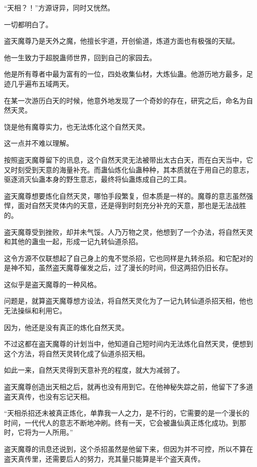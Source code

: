 
\begin{this_body}

“天相？！”方源讶异，同时又恍然。

一切都明白了。

盗天魔尊乃是天外之魔，他擅长宇道，开创偷道，炼道方面也有极强的天赋。

他一生致力于超脱蛊师世界，回到自己的家园去。

他是所有尊者中最为富有的一位，四处收集仙材，大炼仙蛊。他游历地方最多，足迹几乎遍布五域两天。

在某一次游历白天的时候，他意外地发现了一个奇妙的存在，研究之后，命名为自然天灵。

饶是他有魔尊实力，也无法炼化这个自然天灵。

这一点并不难以理解。

按照盗天魔尊留下的讯息，这个自然天灵无法被带出太古白天，而在白天当中，它又时刻受到天意的海量补充。而蛊仙炼化仙蛊种种，其本质就在于用自己的意志，驱逐消灭仙蛊本身的野生意志，最终将仙蛊炼成自己的工具。

盗天魔尊想要炼化自然天灵，哪怕手段繁复，但本质是一样的。魔尊的意志虽然强悍，面对自然天灵体内的天意，还是得到时刻充分补充的天意，那也是无法战胜的。

盗天魔尊受到挫败，却并未气馁。人乃万物之灵，他想到了一个办法，将自然天灵和其他的蛊虫一起，形成一记九转仙道杀招。

这令方源不仅联想起了自己身上的鬼不觉杀招，它也同样是九转杀招。和它配对的是神不知，虽然盗天魔尊催发之后，过了漫长的时间，但这两招仍旧长存。

这似乎是盗天魔尊的一种风格。

问题是，就算盗天魔尊想方设法，将自然天灵化为了一记九转仙道杀招天相，他也无法操纵和利用它。

因为，他还是没有真正的炼化自然天灵。

不过这都在盗天魔尊的计划当中，他知道自己短时间内无法炼化自然天灵，便想到这个方法，将自然天灵转化成了仙道杀招天相。

如此一来，自然天灵得到天意补充的程度，就大为减弱了。

盗天魔尊创造出天相之后，就再也没有用到它。在他神秘失踪之前，他留下了多道盗天真传，也没有忘记天相。

“天相杀招还未被真正炼化，单靠我一人之力，是不行的，它需要的是一个漫长的时间，一代代人的意志不断地冲刷。终有一天，它会被蛊仙真正炼化成功。到那时，它将为一人所用。”

盗天魔尊的讯息还说到，这个杀招虽然是他留下来，但因为并不可控，所以不算在盗天真传里，还需要后人的努力，充其量只能算是半个盗天真传。


\end{this_body}
